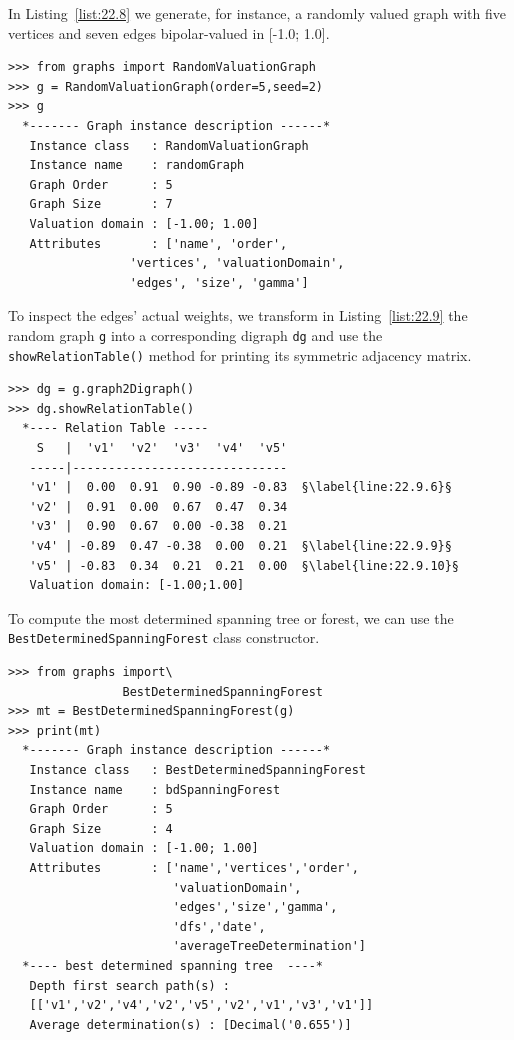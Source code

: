 In Listing~\vref{list:22.8} we generate, for instance, a randomly valued graph with five vertices and seven edges bipolar-valued in [-1.0; 1.0].
\begin{lstlisting}[caption={Generating randomly bipolar-valued graphs.},label=list:22.8]
>>> from graphs import RandomValuationGraph
>>> g = RandomValuationGraph(order=5,seed=2)
>>> g
  *------- Graph instance description ------*
   Instance class   : RandomValuationGraph
   Instance name    : randomGraph
   Graph Order      : 5
   Graph Size       : 7
   Valuation domain : [-1.00; 1.00]
   Attributes       : ['name', 'order',
                 'vertices', 'valuationDomain',
                 'edges', 'size', 'gamma']
\end{lstlisting}
To inspect the edges' actual weights, we transform in Listing~\vref{list:22.9} the random graph \texttt{g} into a corresponding digraph \texttt{dg} and use the \texttt{showRelationTable()} method for printing its symmetric adjacency matrix. 
\begin{lstlisting}[caption={Symmetric relation table},label=list:22.9]
>>> dg = g.graph2Digraph()
>>> dg.showRelationTable()
  *---- Relation Table -----
    S   |  'v1'	 'v2'  'v3'  'v4'  'v5'	  
   -----|------------------------------
   'v1' |  0.00	 0.91  0.90 -0.89 -0.83	 §\label{line:22.9.6}§
   'v2' |  0.91	 0.00  0.67  0.47  0.34	 
   'v3' |  0.90	 0.67  0.00 -0.38  0.21	 
   'v4' | -0.89	 0.47 -0.38  0.00  0.21	 §\label{line:22.9.9}§
   'v5' | -0.83	 0.34  0.21  0.21  0.00	 §\label{line:22.9.10}§
   Valuation domain: [-1.00;1.00]
\end{lstlisting}

To compute the most determined spanning tree or forest, we can use the \texttt{Best\-DeterminedSpanningForest} class constructor.
\begin{lstlisting}[caption={Computing best determined spanning forests.},label=list:22.10]
>>> from graphs import\
                BestDeterminedSpanningForest
>>> mt = BestDeterminedSpanningForest(g)
>>> print(mt)
  *------- Graph instance description ------*
   Instance class   : BestDeterminedSpanningForest
   Instance name    : bdSpanningForest
   Graph Order      : 5
   Graph Size       : 4
   Valuation domain : [-1.00; 1.00]
   Attributes       : ['name','vertices','order',
                       'valuationDomain',
                       'edges','size','gamma',
                       'dfs','date',
                       'averageTreeDetermination']
  *---- best determined spanning tree  ----*
   Depth first search path(s) :
   [['v1','v2','v4','v2','v5','v2','v1','v3','v1']]
   Average determination(s) : [Decimal('0.655')]
\end{lstlisting}

